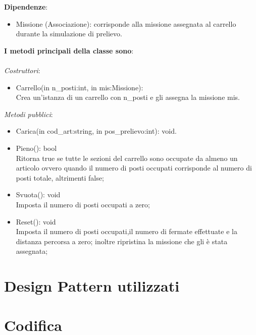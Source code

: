 \textbf{Dipendenze}:
\begin{itemize}
    \item Missione (Associazione): corrisponde alla missione assegnata al carrello durante la simulazione di prelievo.\\
\end{itemize}
\textbf{I metodi principali della classe sono}:
\\\\
\textit{Costruttori}:
\begin{itemize}
    \item Carrello(in n_posti:int, in mis:Missione):\\
    Crea un'istanza di un carrello con n\_posti e gli assegna la missione mis.\\
\end{itemize}
\textit{Metodi pubblici}:
\begin{itemize}
    \item Carica(in cod_art:string, in pos_prelievo:int): void.\\
    \item Pieno(): bool\\
    Ritorna true se tutte le sezioni del carrello sono occupate da almeno un articolo ovvero quando il numero di posti occupati 
    corrisponde al numero di posti totale, altrimenti false;
    \item Svuota(): void\\
    Imposta il numero di posti occupati a zero;
    \item Reset(): void\\  
    Imposta il numero di posti occupati,il numero di fermate effettuate e la distanza percorsa a zero; inoltre ripristina la missione che gli è stata assegnata;
\end{itemize} 

\section{Design Pattern utilizzati}

\section{Codifica}
